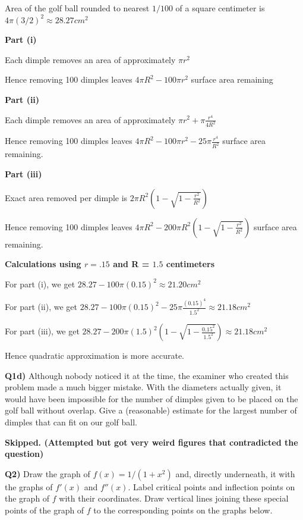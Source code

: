 \documentclass[9pt]{article}
\begin{document}
Area of the golf ball rounded to nearest $1 / 100$ of a square centimeter is $4 \pi (3 / 2)^2 \approx 28.27 cm^2$

\textbf{Part (i)}

Each dimple removes an area of approximately $\pi r^2$

Hence removing 100 dimples leaves $4 \pi R^2 - 100 \pi r^2$ surface area remaining

\textbf{Part (ii)}

Each dimple removes an area of approximately $\pi r^2 + \pi \frac{r^4}{4R^2}$

Hence removing 100 dimples leaves $4 \pi R^2 - 100 \pi r^2 - 25 \pi \frac{r^4}{R^2}$ surface area remaining.

\textbf{Part (iii)}

Exact area removed per dimple is $2 \pi R^2 (1 - \sqrt{1 - \frac{r^2}{R^2}})$

Hence removing 100 dimples leaves $4 \pi R^2 - 200 \pi R^2 (1 - \sqrt{1 - \frac{r^2}{R^2}})$ surface area remaining.

\textbf{Calculations using $r = .15$ and R = $1.5$ centimeters}

For part (i), we get $28.27 - 100 \pi (0.15)^2 \approx 21.20 cm^2$

For part (ii), we get $28.27 - 100 \pi (0.15)^2 - 25 \pi \frac{(0.15)^4}{1.5^2} \approx 21.18 cm^2$

For part (iii), we get $28.27 - 200 \pi (1.5)^2 (1 - \sqrt{1 - \frac{0.15^2}{1.5^2}}) \approx 21.18cm^2$

Hence quadratic approximation is more accurate.


\begin{tcolorbox}
  \textbf{Q1d)} Although nobody noticed it at the time, the examiner who created this problem made a much bigger mistake. With the diameters actually given, it would have been impossible for the number of dimples given to be placed on the golf ball without overlap. Give a (reasonable) estimate for the largest number of dimples that can fit on our golf ball.
\end{tcolorbox}

\textbf{Skipped. (Attempted but got very weird figures that contradicted the question)}


\begin{tcolorbox}
  \textbf{Q2)} Draw the graph of $f(x) = 1/(1 + x^2)$ and, directly underneath, it with the graphs of $f'(x)$ and $f''(x)$. Label critical points and inflection points on the graph of $f$ with their coordinates. Draw vertical lines joining these special points of the graph of $f$ to the corresponding points on the graphs below.
\end{tcolorbox}
\end{document}
